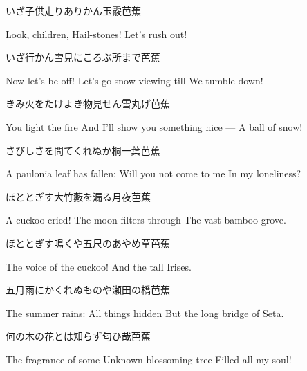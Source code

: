 \begin{haiku}
    {\FH いざ子供走りありかん玉霰}\hfill{\FH 芭蕉}

    \vin{} Look, children,
    \vin{} \vin{} Hail-stones!
    \vin{} \vin{} \vin{} Let's rush out!
\end{haiku}

\begin{haiku}
    {\FH いざ行かん雪見にころぶ所まで}\hfill{\FH 芭蕉}

    \vin{} Now let's be off!
    \vin{} \vin{} Let's go snow-viewing till
    \vin{} \vin{} \vin{} We tumble down!
\end{haiku}

\begin{haiku}
    {\FH きみ火をたけよき物見せん雪丸げ}\hfill{\FH 芭蕉}

    \vin{} You light the fire
    \vin{} \vin{} And I'll show you something nice ---
    \vin{} \vin{} \vin{} A ball of snow!
\end{haiku}

\begin{haiku}
    {\FH さびしさを問てくれぬか桐一葉}\hfill{\FH 芭蕉}

    \vin{} A paulonia leaf has fallen:
    \vin{} \vin{} Will you not come to me
    \vin{} \vin{} \vin{} In my loneliness?
\end{haiku}

\begin{haiku}
    {\FH ほととぎす大竹藪を漏る月夜}\hfill{\FH 芭蕉}

    \vin{} A cuckoo cried!
    \vin{} \vin{} The moon filters through
    \vin{} \vin{} \vin{} The vast bamboo grove.
\end{haiku}

\begin{haiku}
    {\FH ほととぎす鳴くや五尺のあやめ草}\hfill{\FH 芭蕉}

    \vin{} The voice of the cuckoo!
    \vin{} \vin{} And the tall
    \vin{} \vin{} \vin{} Irises.
\end{haiku}

\begin{haiku}
    {\FH 五月雨にかくれぬものや瀬田の橋}\hfill{\FH 芭蕉}

    \vin{} The summer rains:
    \vin{} \vin{} All things hidden
    \vin{} \vin{} \vin{} But the long bridge of Seta.
\end{haiku}

\begin{haiku}
    {\FH 何の木の花とは知らず匂ひ哉}\hfill{\FH 芭蕉}

    \vin{} The fragrance of some
    \vin{} \vin{} Unknown blossoming tree
    \vin{} \vin{} \vin{} Filled all my soul!
\end{haiku}

